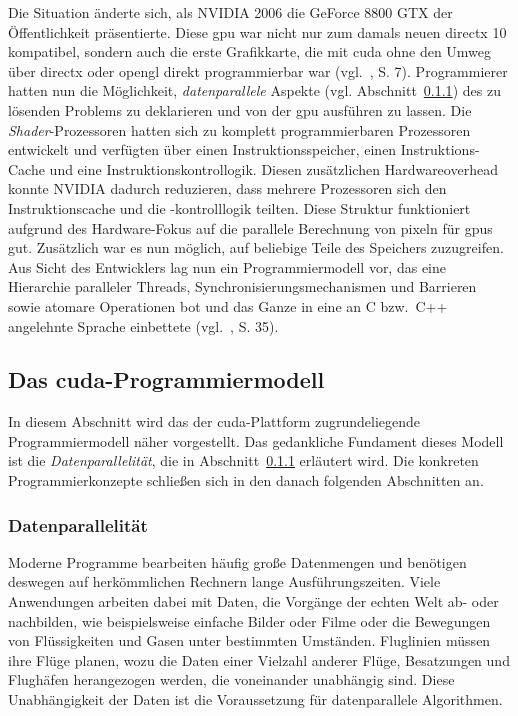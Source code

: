 Die Situation änderte sich, als NVIDIA{\textregistered} 2006 die GeForce{\textregistered} 8800 GTX der Öffentlichkeit
präsentierte. Diese \gls{gpu} war nicht nur zum damals neuen \gls{directx} 10 kompatibel, sondern auch die erste
Grafikkarte, die mit \gls{cuda} ohne den Umweg über \gls{directx} oder \gls{opengl} direkt programmierbar war
(vgl.~\cite{sandkand}, S. 7). Programmierer hatten nun die Möglichkeit, \textit{datenparallele} Aspekte
(vgl. Abschnitt~\ref{sssec:cu_data_par}) des zu lösenden Problems zu deklarieren und von der \gls{gpu} ausführen zu
lassen. Die \textit{Shader}-Prozessoren hatten sich zu komplett programmierbaren Prozessoren entwickelt und verfügten
über einen Instruktionsspeicher, einen Instruktions-Cache und eine Instruktionskontrollogik. Diesen zusätzlichen
Hardwareoverhead konnte NVIDIA{\textregistered} dadurch reduzieren, dass mehrere Prozessoren sich den Instruktionscache
und die -kontrolllogik teilten. Diese Struktur funktioniert aufgrund des Hardware-Fokus auf die parallele Berechnung von
\gls{pixel}n für \gls{gpu}s gut. Zusätzlich war es nun möglich, auf beliebige Teile des Speichers zuzugreifen. Aus Sicht
des Entwicklers lag nun ein Programmiermodell vor, das eine Hierarchie paralleler Threads, Synchronisierungsmechanismen
und Barrieren sowie atomare Operationen bot und das Ganze in eine an C bzw.\ C++ angelehnte Sprache einbettete
(vgl.~\cite{kirkhwu}, S. 35).

\subsection{Das \gls{cuda}-Programmiermodell}

In diesem Abschnitt wird das der \gls{cuda}-Plattform zugrundeliegende Programmiermodell näher vorgestellt. Das
gedankliche Fundament dieses Modell ist die \textit{Datenparallelität}, die in Abschnitt~\ref{sssec:cu_data_par}
erläutert wird. Die konkreten Programmierkonzepte schließen sich in den danach folgenden Abschnitten an.

\subsubsection{Datenparallelität}\label{sssec:cu_data_par}

Moderne Programme bearbeiten häufig große Datenmengen und benötigen deswegen auf herkömmlichen Rechnern lange
Ausführungszeiten. Viele Anwendungen arbeiten dabei mit Daten, die Vorgänge der echten Welt ab- oder nachbilden, wie
beispielsweise einfache Bilder oder Filme oder die Bewegungen von Flüssigkeiten und Gasen unter bestimmten Umständen.
Fluglinien müssen ihre Flüge planen, wozu die Daten einer Vielzahl anderer Flüge, Besatzungen und Flughäfen herangezogen
werden, die voneinander unabhängig sind. Diese Unabhängigkeit der Daten ist die Voraussetzung für datenparallele
Algorithmen.

